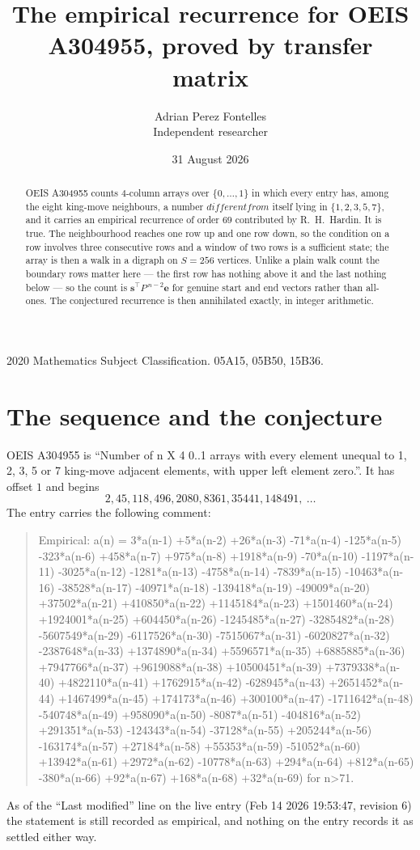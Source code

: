 \documentclass[11pt,a4paper]{article}
\title{The empirical recurrence for OEIS A304955, proved by transfer matrix}
\author{Adrian Perez Fontelles\\ \small Independent researcher}
\date{31 August 2026}
\theoremstyle{plain}
\theoremstyle{definition}
\begin{document}
\maketitle

\begin{abstract}
OEIS A304955 counts $4$-column arrays over $\{0,\dots,1\}$ in which every entry has,
among the eight king-move neighbours, a number $different from$ itself lying in $\{1,2,3,5,7\}$, and it carries an empirical
recurrence of order $69$ contributed by R.~H.~Hardin. It is true. The neighbourhood
reaches one row up and one row down, so the condition on a row involves three consecutive
rows and a window of two rows is a sufficient state; the array is then a walk in a digraph
on $S=256$ vertices. Unlike a plain walk count the boundary rows matter here --- the first
row has nothing above it and the last nothing below --- so the count is
$\mathbf{s}^{\!\top}P^{\,n-2}\mathbf{e}$ for genuine start and end vectors rather than
all-ones. The conjectured recurrence is then annihilated exactly, in integer arithmetic.
\end{abstract}

\noindent\small 2020 Mathematics Subject Classification. 05A15, 05B50, 15B36.\normalsize

\section{The sequence and the conjecture}

OEIS A304955 is ``Number of n X 4 0..1 arrays with every element unequal to 1, 2, 3, 5 or 7 king-move adjacent elements, with upper left element zero.''. It has offset
$1$ and begins
\[
2, 45, 118, 496, 2080, 8361, 35441, 148491,\ \dots
\]
The entry carries the following comment:
\begin{quote}\small
Empirical: a(n) = 3*a(n-1) +5*a(n-2) +26*a(n-3) -71*a(n-4) -125*a(n-5) -323*a(n-6) +458*a(n-7) +975*a(n-8) +1918*a(n-9) -70*a(n-10) -1197*a(n-11) -3025*a(n-12) -1281*a(n-13) -4758*a(n-14) -7839*a(n-15) -10463*a(n-16) -38528*a(n-17) -40971*a(n-18) -139418*a(n-19) -49009*a(n-20) +37502*a(n-21) +410850*a(n-22) +1145184*a(n-23) +1501460*a(n-24) +1924001*a(n-25) +604450*a(n-26) -1245485*a(n-27) -3285482*a(n-28) -5607549*a(n-29) -6117526*a(n-30) -7515067*a(n-31) -6020827*a(n-32) -2387648*a(n-33) +1374890*a(n-34) +5596571*a(n-35) +6885885*a(n-36) +7947766*a(n-37) +9619088*a(n-38) +10500451*a(n-39) +7379338*a(n-40) +4822110*a(n-41) +1762915*a(n-42) -628945*a(n-43) +2651452*a(n-44) +1467499*a(n-45) +174173*a(n-46) +300100*a(n-47) -1711642*a(n-48) -540748*a(n-49) +958090*a(n-50) -8087*a(n-51) -404816*a(n-52) +291351*a(n-53) -124343*a(n-54) -37128*a(n-55) +205244*a(n-56) -163174*a(n-57) +27184*a(n-58) +55353*a(n-59) -51052*a(n-60) +13942*a(n-61) +2972*a(n-62) -10778*a(n-63) +294*a(n-64) +812*a(n-65) -380*a(n-66) +92*a(n-67) +168*a(n-68) +32*a(n-69) for n>71.
\end{quote}
As of the ``Last modified'' line on the live entry (Feb 14 2026 19:53:47, revision
6) the statement is still recorded as empirical, and nothing on the entry
records it as settled either way.
\end{document}
